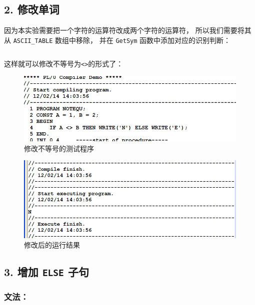 \documentclass[]{guo}
\begin{document}
\subsection{2. 修改单词}

因为本实验需要把一个字符的运算符改成两个字符的运算符，
所以我们需要将其从 \texttt{ASCII_TABLE} 数组中移除，
并在 \texttt{GetSym} 函数中添加对应的识别判断：

\inputminted[baselinestretch=0.75,firstline=562,lastline=573,fontsize=\fontlm]{cpp}{Unit1.cpp}

这样就可以修改不等号为\texttt{<>}的形式了：

\begin{figure}[h!]
    \caption{修改不等号的测试程序}
    \centering
        \includegraphics[scale=0.5]{figure/not_equ.png}
\end{figure}

\begin{figure}[h!]
    \caption{修改后的运行结果}
    \centering
        \includegraphics[scale=0.25]{figure/not_equ-output.png}
\end{figure}

\clearpage

\subsection{3. 增加 \texttt{ELSE} 子句}

\subsubsection{文法：}
\begin{bnf*}
        {    }\\
        {  \bnfor \bnfes}
\end{bnf*}
\end{document}
